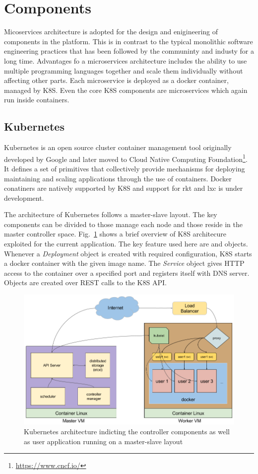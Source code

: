 \documentclass[DD]{iitmdiss}
\begin{document}
\section{Components}
Micoservices architecture \citep{dragoni_microservices:_2016} is adopted for the design and enigineering of components in the platform. This is in contrast to the typical monolithic software engineering practices that has been followed by the communinty and industy for a long time. Advantages fo a microservices architecture includes the ability to use multiple programming languages together and scale them individually without affecting other parts. Each microservice is deployed as a docker container, managed by K8S. Even the core K8S components are microservices which again run inside containers.

\subsection{Kubernetes}
Kubernetes is an open source cluster container management tool originally developed by Google \citep{burns_borg_2016} and later moved to Cloud Native Computing Foundation\footnote{\url{https://www.cncf.io/}}. It defines a set of primitives that collectively provide mechanisms for deploying maintaining and scaling applications through the use of containers. Docker conatiners are natively supported by K8S and support for rkt and lxc is under development.

The architecture of Kubernetes follows a master-slave layout. The key components can be divided to those manage each node and those reside in the master controller space. Fig.~\ref{fig:systeminternalarch} shows a brief overview of K8S architecure exploited for the current application. The key feature used here are \textit{\cite{deployments}} and \textit{\cite{services}} objects. Whenever a \textit{Deployment} object is created with required configuration, K8S starts a docker container with the given image name. The \textit{Service} object gives HTTP access to the container over a specified port and registers itself with DNS server. Objects are created over REST calls to the K8S API.

\begin{figure}
\centering
\includegraphics[width=0.9\linewidth]{img/system_internal_arch}
\caption[Kubernetes architecture]{Kubernetes architecture indicting the controller components as well as user application running on a master-slave layout}
\label{fig:systeminternalarch}
\end{figure}
 
\end{document}
